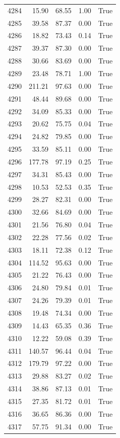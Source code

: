 \begin{longtable}{rrrrr}
4284 & 15.90 & 68.55 & 1.00 & True \\
4285 & 39.58 & 87.37 & 0.00 & True \\
4286 & 18.82 & 73.43 & 0.14 & True \\
4287 & 39.37 & 87.30 & 0.00 & True \\
4288 & 30.66 & 83.69 & 0.00 & True \\
4289 & 23.48 & 78.71 & 1.00 & True \\
4290 & 211.21 & 97.63 & 0.00 & True \\
4291 & 48.44 & 89.68 & 0.00 & True \\
4292 & 34.09 & 85.33 & 0.00 & True \\
4293 & 20.62 & 75.75 & 0.04 & True \\
4294 & 24.82 & 79.85 & 0.00 & True \\
4295 & 33.59 & 85.11 & 0.00 & True \\
4296 & 177.78 & 97.19 & 0.25 & True \\
4297 & 34.31 & 85.43 & 0.00 & True \\
4298 & 10.53 & 52.53 & 0.35 & True \\
4299 & 28.27 & 82.31 & 0.00 & True \\
4300 & 32.66 & 84.69 & 0.00 & True \\
4301 & 21.56 & 76.80 & 0.04 & True \\
4302 & 22.28 & 77.56 & 0.02 & True \\
4303 & 18.11 & 72.38 & 0.12 & True \\
4304 & 114.52 & 95.63 & 0.00 & True \\
4305 & 21.22 & 76.43 & 0.00 & True \\
4306 & 24.80 & 79.84 & 0.01 & True \\
4307 & 24.26 & 79.39 & 0.01 & True \\
4308 & 19.48 & 74.34 & 0.00 & True \\
4309 & 14.43 & 65.35 & 0.36 & True \\
4310 & 12.22 & 59.08 & 0.39 & True \\
4311 & 140.57 & 96.44 & 0.04 & True \\
4312 & 179.79 & 97.22 & 0.00 & True \\
4313 & 29.88 & 83.27 & 0.02 & True \\
4314 & 38.86 & 87.13 & 0.01 & True \\
4315 & 27.35 & 81.72 & 0.01 & True \\
4316 & 36.65 & 86.36 & 0.00 & True \\
4317 & 57.75 & 91.34 & 0.00 & True \\

\end{longtable}
